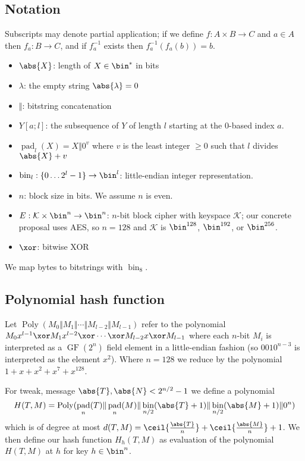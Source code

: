 \documentclass[letterpaper,11pt]{article}
\newcommand*{\Concat}{\Vert}
\DeclareMathOperator{\GF}{GF}
\DeclareMathOperator{\fromint}{bin}
\DeclareMathOperator{\pad}{pad}
\DeclareMathOperator{\Poly}{Poly}
\begin{document}
\subsection{Notation}
Subscripts may denote partial application; if we define $f: A \times B \rightarrow C$ and
$a \in A$ then $f_a: B \rightarrow C$, and if $f_a^{-1}$ exists then $f_a^{-1}(f_a(b)) = b$.
\begin{itemize}
    \item $\abs{X}$: length of $X \in \bin^{*}$ in bits
    \item $\lambda$: the empty string $\abs{\lambda} = 0$
    \item $\Concat$: bitstring concatenation
    \item $Y[a;l]$: the subsequence of $Y$ of length $l$ starting at the 0-based index $a$.
    \item $\pad_l(X) = X \Concat 0^v$
    where $v$ is the least integer $\geq 0$ such that $l$ divides $\abs{X} + v$
    \item $\fromint_l: \{0 \ldots 2^l-1\} \rightarrow \bin^l$: little-endian integer representation.
    \item \(n\): block size in bits. We assume \(n\) is even.
    \item \(E: \mathcal{K} \times \bin^n \rightarrow \bin^n\): 
    \(n\)-bit block cipher with keyspace \(\mathcal{K}\);
    our concrete proposal uses AES, so \(n=128\) and \(\mathcal{K}\) is
    \(\bin^{128}\), \(\bin^{192}\), or \(\bin^{256}\). 
    \item \(\xor\): bitwise XOR
\end{itemize}
We map bytes to bitstrings with \(\fromint_8\).

\subsection{Polynomial hash function}

Let \(\Poly(M_0 \Concat M_1 \Concat \cdots \Concat M_{l-2} \Concat M_{l-1})\)
refer to the polynomial
\(M_0x^{l-1} \xor M_1x^{l-2} \xor \cdots \xor M_{l-2}x \xor M_{l-1}\)
where each \(n\)-bit \(M_i\) is interpreted as a \(\GF(2^n)\)
field element in a little-endian fashion
(so \(0010^{n-3}\) is interpreted as the element \(x^2\)).
Where \(n=128\) we reduce by the polynomial
\(1 + x + x^2 + x^7 + x^{128}\).

For tweak, message \(\abs{T}, \abs{N} < 2^{n/2} -1\) we define a polynomial
\begin{displaymath}
    H(T, M) = \Poly(\pad_n(T) \Concat \pad_n(M) \Concat \fromint_{n/2}(\abs{T} + 1) \Concat \fromint_{n/2}(\abs{M} + 1) \Concat 0^n)
\end{displaymath}
which is of degree at most
\(d(T, M) = \ceil{\frac{\abs{T}}{n}} + \ceil{\frac{\abs{M}}{n}} + 1\).
We then define our hash function \(H_h(T, M)\) as evaluation
of the polynomial \(H(T, M)\) at \(h\) for key \(h \in \bin^n\).
\end{document}
